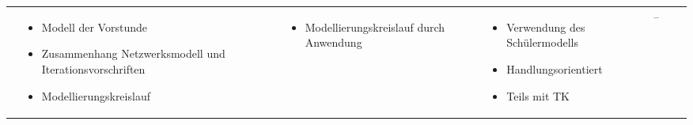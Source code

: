 \begin{landscape}
\begin{longtable}{|C{0.05\textwidth}|L{0.2\textwidth}|L{0.3\textwidth}|L{0.25\textwidth}|L{0.3\textwidth}|L{0.25\textwidth}|L{0.1\textwidth}|}
\begin{itemize}
\end{itemize}&\begin{itemize}
	\item Modell der Vorstunde
	\item Zu\-sam\-men\-hang Netzwerksmodell und Iterationsvorschriften
	\item Modellierungs\-kreislauf
\end{itemize}&\begin{itemize}
	\item Modellierungs\-kreislauf durch Anwendung
\end{itemize}&\begin{itemize}
	\item Verwendung des Schülermodells
	\item Hand\-lungs\-o\-ri\-en\-tiert
	\item Teils mit TK
\end{itemize}&--\\
\end{longtable}
\end{landscape}